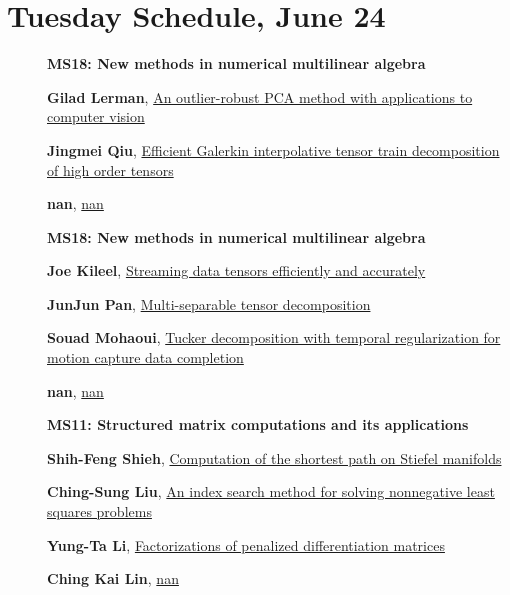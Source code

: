 \documentclass[ILAS2025-program.tex]{subfiles}
\begin{document}
    \newpage

\section*{Tuesday Schedule, June 24 }
        
        \begin{description}
    \item[] {\color{mstitle}\textbf{MS18: New methods in numerical multilinear algebra}} 
    \item[] \hypertarget{up0147}{}\textbf{Gilad Lerman}, \hyperlink{down0147}{An outlier-robust PCA method with applications to computer vision
}
        \item[] \hypertarget{up0148}{}\textbf{Jingmei Qiu}, \hyperlink{down0148}{Efficient Galerkin interpolative tensor train decomposition of high order tensors
}
        \item[] \hypertarget{up0149}{}\textbf{nan}, \hyperlink{down0149}{nan}
        \end{description}
    \begin{description}
    \item[] {\color{mstitle}\textbf{MS18: New methods in numerical multilinear algebra}} 
    \item[] \hypertarget{up0189}{}\textbf{Joe Kileel}, \hyperlink{down0189}{Streaming data tensors efficiently and accurately
}
        \item[] \hypertarget{up0190}{}\textbf{JunJun Pan}, \hyperlink{down0190}{Multi-separable tensor decomposition}
        \item[] \hypertarget{up0191}{}\textbf{Souad Mohaoui}, \hyperlink{down0191}{Tucker decomposition with temporal regularization for motion capture data completion}
        \item[] \hypertarget{up0192}{}\textbf{nan}, \hyperlink{down0192}{nan}
        \end{description}
    \begin{description}
    \item[] {\color{mstitle}\textbf{MS11: Structured matrix computations and its applications}} 
    \item[] \hypertarget{up0233}{}\textbf{Shih-Feng Shieh}, \hyperlink{down0233}{Computation of the shortest path on Stiefel manifolds}
        \item[] \hypertarget{up0234}{}\textbf{Ching-Sung Liu}, \hyperlink{down0234}{An index search method for solving nonnegative least squares problems
}
        \item[] \hypertarget{up0235}{}\textbf{Yung-Ta Li}, \hyperlink{down0235}{Factorizations of penalized differentiation matrices
}
        \item[] \hypertarget{up0236}{}\textbf{Ching Kai Lin}, \hyperlink{down0236}{nan}
        \end{description}
    \newpage
\end{document}

